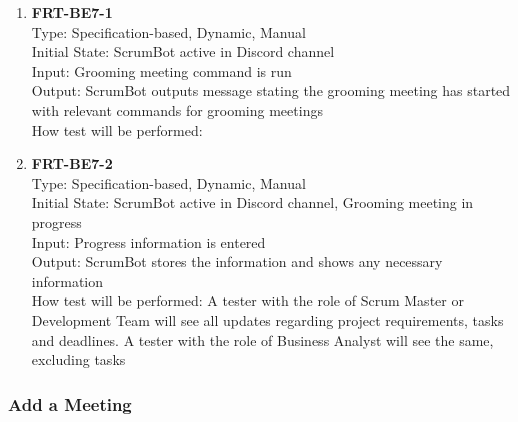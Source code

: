 \documentclass[12pt, titlepage]{article}
\begin{document}
\begin{enumerate}
    \item{\textbf{FRT-BE7-1}}\\
    Type: Specification-based, Dynamic, Manual\\
    Initial State: ScrumBot active in Discord channel\\
    Input: Grooming meeting command is run\\
    Output: ScrumBot outputs message stating the grooming meeting has started with relevant commands for grooming meetings\\
    How test will be performed: \\
    
    \item{\textbf{FRT-BE7-2}}\\
    Type: Specification-based, Dynamic, Manual\\
    Initial State: ScrumBot active in Discord channel, Grooming meeting in progress\\
    Input: Progress information is entered\\
    Output: ScrumBot stores the information and shows any necessary information\\
    How test will be performed: A tester with the role of Scrum Master or Development Team will see all updates regarding project requirements, tasks and deadlines. A tester with the role of Business Analyst will see the same, excluding tasks\\
\end{enumerate}

\subsubsection{Add a Meeting}
\end{document}
